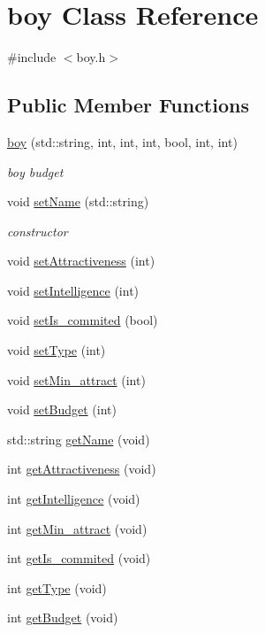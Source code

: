 \hypertarget{classboy}{}\section{boy Class Reference}
\label{classboy}


{\ttfamily \#include $<$boy.\+h$>$}

\subsection*{Public Member Functions}
\begin{DoxyCompactItemize}
\item 
\hyperlink{classboy_aeda8572de2e02a1707c2ca5cf1e5fadb}{boy} (std\+::string, int, int, int, bool, int, int)
\begin{DoxyCompactList}\small\item\em boy budget \end{DoxyCompactList}\item 
void \hyperlink{classboy_a5d2297ec625c9ea85cac3987255380fc}{set\+Name} (std\+::string)
\begin{DoxyCompactList}\small\item\em constructor \end{DoxyCompactList}\item 
void \hyperlink{classboy_a97f0db302fe7af4f96865b7cf101e882}{set\+Attractiveness} (int)
\item 
void \hyperlink{classboy_ac30638dc34282b9e3c2184c17c3747a4}{set\+Intelligence} (int)
\item 
void \hyperlink{classboy_a4b3da7e37c55db15f496e8f3bb1d3a2b}{set\+Is\+\_\+commited} (bool)
\item 
void \hyperlink{classboy_a7e7af130f5dae098e9cc5b7f20cb5e0d}{set\+Type} (int)
\item 
void \hyperlink{classboy_a9969c10ff3d9cbf1318b638aa5746c89}{set\+Min\+\_\+attract} (int)
\item 
void \hyperlink{classboy_aaf145f49ec525b3a66a9803ce8cf07c4}{set\+Budget} (int)
\item 
std\+::string \hyperlink{classboy_a670dc0382568e874db1b457e922c4410}{get\+Name} (void)
\item 
int \hyperlink{classboy_a49ba309bc8a901988aec23a9485fe9b8}{get\+Attractiveness} (void)
\item 
int \hyperlink{classboy_a7e97d2b18e6e788d3665f89c5c324a4c}{get\+Intelligence} (void)
\item 
int \hyperlink{classboy_a1127d720a42a8b99e8b8b5232a01888b}{get\+Min\+\_\+attract} (void)
\item 
int \hyperlink{classboy_adfc4e65cda02ff33a0fdf3809f808c6d}{get\+Is\+\_\+commited} (void)
\item 
int \hyperlink{classboy_a4449dd8bd85b8fb071624c00843d4879}{get\+Type} (void)
\item 
int \hyperlink{classboy_afcc38a4a00dcb96193565acce288b170}{get\+Budget} (void)
\end{DoxyCompactItemize}

